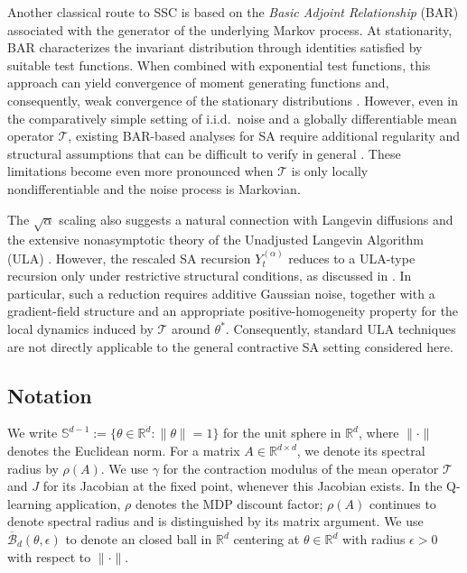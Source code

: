 \documentclass[11pt,letterpaper]{article}
\theoremstyle{plain}
\theoremstyle{definition}
\theoremstyle{remark}
\newcommand{\mT}{\mathcal{T}}
\newcommand{\R}{\mathbb{R}}
\newcommand{\B}{\mathcal{B}}
\begin{document}
Another classical route to SSC is based on the
\emph{Basic Adjoint Relationship} (BAR) associated with the generator of the
underlying Markov process. At stationarity, BAR characterizes the invariant
distribution through identities satisfied by suitable test functions.
When combined with exponential test functions, this approach can yield
convergence of moment generating functions and, consequently, weak
convergence of the stationary distributions
\citep{BravDaiMiya2017,BravDaiMiya2023,chen2022stationary}.
However, even in the comparatively simple setting of i.i.d.\ noise and a
globally differentiable mean operator $\mT$, existing BAR-based analyses for
SA require additional regularity and structural assumptions that can be
difficult to verify in general \citep{chen2022stationary}. These limitations
become even more pronounced when $\mT$ is only locally nondifferentiable and
the noise process is Markovian.

The $\sqrt{\alpha}$ scaling also suggests a natural connection with Langevin
diffusions and the extensive nonasymptotic theory of the Unadjusted Langevin
Algorithm (ULA)
\citep{durmus2017nonasymptotic,durmus2019high}. However, the rescaled SA recursion
$Y_t^{(\alpha)}$ reduces to a ULA-type recursion only under restrictive
structural conditions, as discussed in
\cite{zhang2024prelimit}. In particular, such a reduction requires additive
Gaussian noise, together with a gradient-field structure and an appropriate
positive-homogeneity property for the local dynamics induced by $\mT$ around
$\theta^*$. Consequently, standard ULA techniques are not directly applicable
to the general contractive SA setting considered here.


\subsection{ Notation}\label{sec:notation}
We write $\mathbb{S}^{d-1} := \{\theta \in \mathbb{R}^d : \|\theta\| = 1\}$ for the unit sphere in $\mathbb{R}^d$, where $\|\cdot\|$ denotes the Euclidean norm. For a matrix $A\in\mathbb{R}^{d\times d}$, we denote its spectral radius by
$\rho(A)$.
We use \(\gamma\) for the contraction modulus of the mean operator \(\mT\)
and \(J\) for its Jacobian at the fixed point, whenever this Jacobian exists.
In the Q-learning application, \(\rho\) denotes the MDP discount factor;
\(\rho(A)\) continues to denote spectral radius and is distinguished by its
matrix argument.
 We use $\overline{\B}_d(\theta, \epsilon)$ to denote an closed ball in $\R^d$ centering at $\theta \in \R^d$ with radius $\epsilon>0$ with respect to $\|\cdot\|$. 
 
\end{document}
